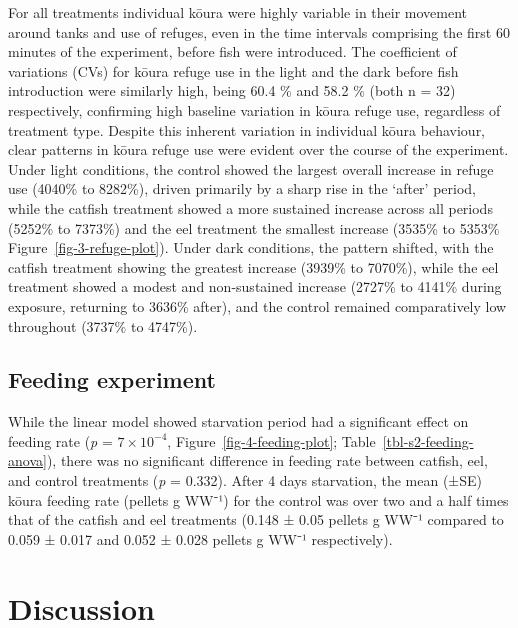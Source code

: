 \documentclass[
  letterpaper,
  DIV=11,
  numbers=noendperiod]{scrartcl}
\begin{document}
For all treatments individual kōura were highly variable in their
movement around tanks and use of refuges, even in the time intervals
comprising the first 60 minutes of the experiment, before fish were
introduced. The coefficient of variations (CVs) for kōura refuge use in
the light and the dark before fish introduction were similarly high,
being 60.4 \% and 58.2 \% (both n = 32) respectively, confirming high
baseline variation in kōura refuge use, regardless of treatment type.
Despite this inherent variation in individual kōura behaviour, clear
patterns in kōura refuge use were evident over the course of the
experiment. Under light conditions, the control showed the largest
overall increase in refuge use (4040\% to 8282\%), driven primarily by a
sharp rise in the `after' period, while the catfish treatment showed a
more sustained increase across all periods (5252\% to 7373\%) and the
eel treatment the smallest increase (3535\% to 5353\%
Figure~\ref{fig-3-refuge-plot}). Under dark conditions, the pattern
shifted, with the catfish treatment showing the greatest increase
(3939\% to 7070\%), while the eel treatment showed a modest and
non-sustained increase (2727\% to 4141\% during exposure, returning to
3636\% after), and the control remained comparatively low throughout
(3737\% to 4747\%).

\subsection{Feeding experiment}\label{feeding-experiment-1}

While the linear model showed starvation period had a significant effect
on feeding rate (\emph{p} = \ensuremath{7\times 10^{-4}},
Figure~\ref{fig-4-feeding-plot}; Table~\ref{tbl-s2-feeding-anova}),
there was no significant difference in feeding rate between catfish,
eel, and control treatments (\emph{p} = 0.332). After 4 days starvation,
the mean (±SE) kōura feeding rate (pellets g WW⁻¹) for the control was
over two and a half times that of the catfish and eel treatments (0.148
± 0.05 pellets g WW⁻¹ compared to 0.059 ± 0.017 and 0.052 ± 0.028
pellets g WW⁻¹ respectively).

\section{Discussion}\label{discussion}
\end{document}
